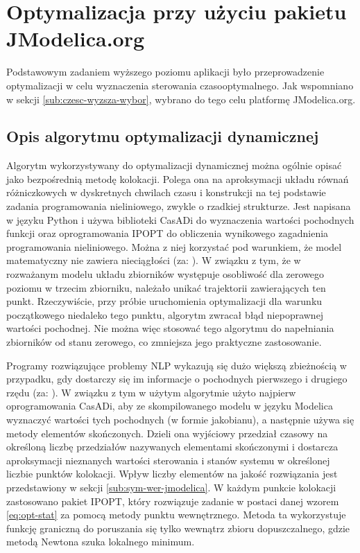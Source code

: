 \section{Optymalizacja przy użyciu pakietu JModelica.org}
\label{sec:opt}

Podstawowym zadaniem wyższego poziomu aplikacji było przeprowadzenie optymalizacji w celu wyznaczenia sterowania czasooptymalnego. Jak wspomniano w sekcji \ref{sub:czesc-wyzsza-wybor}, wybrano do tego celu platformę JModelica.org.

\subsection{Opis algorytmu optymalizacji dynamicznej}
\label{sub:opt-alg}

Algorytm wykorzystywany do optymalizacji dynamicznej można ogólnie opisać jako bezpośrednią metodę kolokacji. Polega ona na aproksymacji układu równań różniczkowych w dyskretnych chwilach czasu i konstrukcji na tej podstawie zadania programowania nieliniowego, zwykle o rzadkiej strukturze. Jest napisana w języku Python i używa biblioteki CasADi do wyznaczenia wartości pochodnych funkcji oraz oprogramowania IPOPT do obliczenia wynikowego zagadnienia programowania nieliniowego. Można z niej korzystać pod warunkiem, że model matematyczny nie zawiera nieciągłości (za: \cite{JModelicaUserGuide}). W związku z tym, że w rozważanym modelu układu zbiorników występuje osobliwość dla zerowego poziomu w trzecim zbiorniku, należało unikać trajektorii zawierających ten punkt.
Rzeczywiście, przy próbie uruchomienia optymalizacji dla warunku początkowego niedaleko tego punktu, algorytm zwracał błąd niepoprawnej wartości pochodnej.
Nie można więc stosować tego algorytmu do napełniania zbiorników od stanu zerowego, co zmniejsza jego praktyczne zastosowanie.

Programy rozwiązujące problemy NLP wykazują się dużo większą zbieżnością w przypadku, gdy dostarczy się im informacje o pochodnych pierwszego i drugiego rzędu (za: \cite{and+11mod11}). W związku z tym w użytym algorytmie użyto najpierw oprogramowania CasADi, aby ze skompilowanego modelu w języku Modelica wyznaczyć wartości tych pochodnych (w formie jakobianu), a następnie używa się metody elementów skończonych. Dzieli ona wyjściowy przedział czasowy na określoną liczbę przedziałów nazywanych elementami skończonymi i dostarcza aproksymacji nieznanych wartości sterowania i stanów systemu w określonej liczbie punktów kolokacji. Wpływ liczby elementów na jakość rozwiązania jest przedstawiony w sekcji \ref{sub:sym-wer-jmodelica}.
W każdym punkcie kolokacji zastosowano pakiet IPOPT, który rozwiązuje zadanie w postaci danej wzorem \ref{eq:opt-stat} za pomocą metody punktu wewnętrznego. Metoda ta wykorzystuje funkcję graniczną do poruszania się tylko wewnątrz zbioru dopuszczalnego, gdzie metodą Newtona szuka lokalnego minimum.

